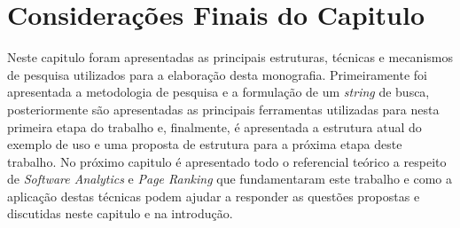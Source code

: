 \section{Considerações Finais do Capitulo}
Neste capitulo foram apresentadas as principais estruturas, técnicas e mecanismos de pesquisa utilizados para a elaboração desta monografia. Primeiramente foi apresentada a metodologia de pesquisa e a formulação de um \textit{string} de busca, posteriormente são apresentadas as principais ferramentas utilizadas para nesta primeira etapa do trabalho e, finalmente, é apresentada a estrutura atual do exemplo de uso e uma proposta de estrutura para a próxima etapa deste trabalho. No próximo capitulo é apresentado todo o referencial teórico a respeito de \textit{Software Analytics} e \textit{Page Ranking} que fundamentaram este trabalho e como a aplicação destas técnicas podem ajudar a responder as questões propostas e discutidas neste capitulo e na introdução.


